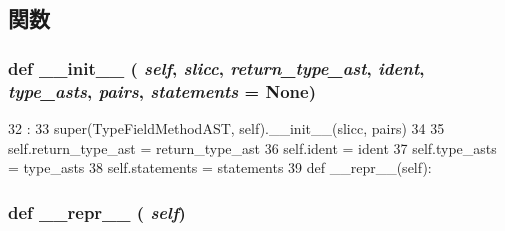 \subsection{関数}
\hypertarget{classslicc_1_1ast_1_1TypeFieldMethodAST_1_1TypeFieldMethodAST_ac775ee34451fdfa742b318538164070e}{
\subsubsection[{\_\-\_\-init\_\-\_\-}]{\setlength{\rightskip}{0pt plus 5cm}def \_\-\_\-init\_\-\_\- ( {\em self}, \/   {\em slicc}, \/   {\em return\_\-type\_\-ast}, \/   {\em ident}, \/   {\em type\_\-asts}, \/   {\em pairs}, \/   {\em statements} = {\ttfamily None})}}
\label{classslicc_1_1ast_1_1TypeFieldMethodAST_1_1TypeFieldMethodAST_ac775ee34451fdfa742b318538164070e}



\begin{DoxyCode}
32                           :
33         super(TypeFieldMethodAST, self).__init__(slicc, pairs)
34 
35         self.return_type_ast = return_type_ast
36         self.ident = ident
37         self.type_asts = type_asts
38         self.statements = statements
39 
    def __repr__(self):
\end{DoxyCode}
\hypertarget{classslicc_1_1ast_1_1TypeFieldMethodAST_1_1TypeFieldMethodAST_ad8b9328939df072e4740cd9a63189744}{
\subsubsection[{\_\-\_\-repr\_\-\_\-}]{\setlength{\rightskip}{0pt plus 5cm}def \_\-\_\-repr\_\-\_\- ( {\em self})}}
\label{classslicc_1_1ast_1_1TypeFieldMethodAST_1_1TypeFieldMethodAST_ad8b9328939df072e4740cd9a63189744}



